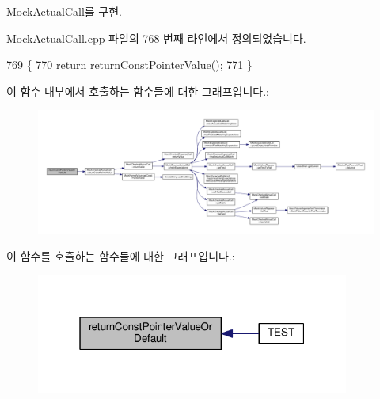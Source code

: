 \hyperlink{class_mock_actual_call_ae4413fb3ce04bec4bf91175f24be823f}{Mock\+Actual\+Call}를 구현.



Mock\+Actual\+Call.\+cpp 파일의 768 번째 라인에서 정의되었습니다.


\begin{DoxyCode}
769 \{
770     \textcolor{keywordflow}{return} \hyperlink{class_mock_actual_call_trace_abbff97f8af6ab7acb912ba62b912a457}{returnConstPointerValue}();
771 \}
\end{DoxyCode}


이 함수 내부에서 호출하는 함수들에 대한 그래프입니다.\+:
\nopagebreak
\begin{figure}[H]
\begin{center}
\leavevmode
\includegraphics[width=350pt]{class_mock_actual_call_trace_acb5d9810c30b2894f68e201cb70e19ed_cgraph}
\end{center}
\end{figure}




이 함수를 호출하는 함수들에 대한 그래프입니다.\+:
\nopagebreak
\begin{figure}[H]
\begin{center}
\leavevmode
\includegraphics[width=292pt]{class_mock_actual_call_trace_acb5d9810c30b2894f68e201cb70e19ed_icgraph}
\end{center}
\end{figure}


